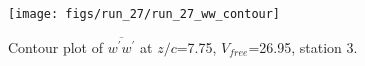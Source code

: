 \begin{figure}[H]
\centering
\texttt{[image: figs/run\_27/run\_27\_ww\_contour]}
\caption{Contour plot of $\overline{w^\prime w^\prime}$ at $z/c$=7.75, $V_{free}$=26.95, station 3.}
\label{fig:run_27_ww_contour}
\end{figure}


